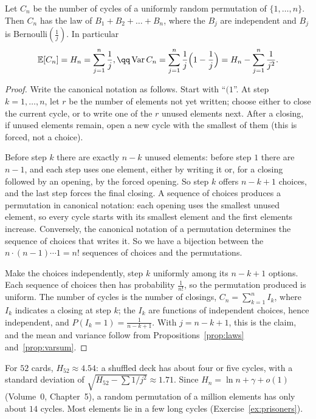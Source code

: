 \begin{theorem}\label{thm:feller}
Let $C_n$ be the number of cycles of a uniformly random permutation of $\{1,\dots,n\}$. Then $C_n$ has the law of
$B_1+B_2+\dots+B_n$, where the $B_j$ are independent and $B_j$ is Bernoulli$(\frac1j)$. In particular
\[
\begin{gathered}\mathbb E[C_n]=H_n=\sum_{j=1}^n\frac1j,\qq\operatorname{Var}C_n=\sum_{j=1}^n\frac1j\Bigl(1-\frac1j\Bigr)=H_n-\sum_{j=1}^n\frac1{j^2}.\end{gathered}
\]
\end{theorem}
\begin{proof}
Write the canonical notation as follows. Start with ``$(1$''. At step $k=1,\dots,n$, let $r$ be the number of elements
not yet written; choose either to close the current cycle, or to write one of the $r$ unused elements next. After a
closing, if unused elements remain, open a new cycle with the smallest of them (this is forced, not a choice).

Before step $k$ there are exactly $n-k$ unused elements: before step $1$ there are $n-1$, and each step uses one
element, either by writing it or, for a closing followed by an opening, by the forced opening. So step $k$ offers
$n-k+1$ choices, and the last step forces the final closing. A sequence of choices produces a permutation in canonical
notation: each opening uses the smallest unused element, so every cycle starts with its smallest element and the
first elements increase. Conversely, the canonical notation of a permutation determines the sequence of choices
that writes it. So we have a bijection between the $n\cdot(n-1)\cdots1=n!$ sequences of choices and the permutations.

Make the choices independently, step $k$ uniformly among its $n-k+1$ options. Each sequence of choices then has
probability $\frac1{n!}$, so the permutation produced is uniform. The number of cycles is the number of closings,
$C_n=\sum_{k=1}^nI_k$, where $I_k$ indicates a closing at step $k$; the $I_k$ are functions of independent choices,
hence independent, and $P(I_k=1)=\frac1{n-k+1}$. With $j=n-k+1$, this is the claim, and the mean and variance follow
from Propositions~\ref{prop:laws} and~\ref{prop:varsum}.
\end{proof}

For $52$ cards, $H_{52}\approx4.54$: a shuffled deck has about four or five cycles, with a standard deviation of
$\sqrt{H_{52}-\sum1/j^2}\approx1.71$. Since $H_n=\ln n+\gamma+o(1)$ (Volume~0, Chapter~5), a random permutation of a
million elements has only about $14$ cycles. Most elements lie in a few long cycles (Exercise~\ref{ex:prisoners}).

